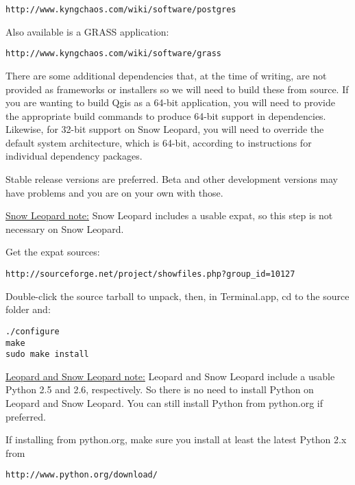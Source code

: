 \begin{verbatim}
http://www.kyngchaos.com/wiki/software/postgres 
\end{verbatim}

Also available is a GRASS application:

\begin{verbatim}
http://www.kyngchaos.com/wiki/software/grass
\end{verbatim}

There are some additional dependencies that, at the time of writing, are not
provided as frameworks or installers so we will need to build these from source.
If you are wanting to build Qgis as a 64-bit application, you will need to 
provide the appropriate build commands to produce 64-bit support in dependencies.
Likewise, for 32-bit support on Snow Leopard, you will need to override the
default system architecture, which is 64-bit, according to instructions for
individual dependency packages.

Stable release versions are preferred.  Beta and other development versions may
have problems and you are on your own with those.

\underline{Snow Leopard note:} Snow Leopard includes a usable expat, so this step is 
not necessary on Snow Leopard.

Get the expat sources:

\begin{verbatim}
http://sourceforge.net/project/showfiles.php?group_id=10127 
\end{verbatim}

Double-click the source tarball to unpack, then, in Terminal.app, cd to the source folder and:

\begin{verbatim}
./configure
make 
sudo make install 
\end{verbatim}

\underline{Leopard and Snow Leopard note:} Leopard and Snow Leopard include a usable
Python 2.5 and 2.6, respectively. So there is no need to install Python on
Leopard and Snow Leopard. You can still install Python from python.org if preferred.

If installing from python.org, make sure you install at least the latest Python 2.x from 

\begin{verbatim}
http://www.python.org/download/
\end{verbatim}

